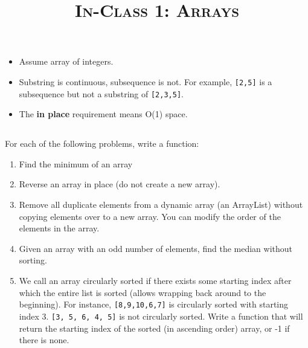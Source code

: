 \documentclass{article}
\title{\large{\textsc{In-Class 1: Arrays}}}
\date{}
\begin{document}
\maketitle

\begin{itemize}
    \item Assume array of integers.
    
    \item Substring is continuous, subsequence is not. For example, \texttt{[2,5]} is a subsequence but not a substring of \texttt{[2,3,5]}.
    
    \item The \textbf{in place} requirement means O(1) space.
\end{itemize}

\subsection*{}

For each of the following problems, write a function:

\begin{enumerate}

    \item Find the minimum of an array
    
    \item Reverse an array in place (do not create a new array).
    
    \item Remove all duplicate elements from a dynamic array (an ArrayList) without copying elements over to a new array. You can modify the order of the elements in the array.

    \item Given an array with an odd number of elements, find the median without sorting.
    
    \item We call an array circularly sorted if there exists some starting index after which the entire list is sorted (allows wrapping back around to the beginning). For instance, \texttt{[8,9,10,6,7]} is circularly sorted with starting index 3. \texttt{[3, 5, 6, 4, 5]} is not circularly sorted. Write a function that will return the starting index of the sorted (in ascending order) array, or -1 if there is none.
\end{enumerate}
    
\subsection*{}
\end{document}
